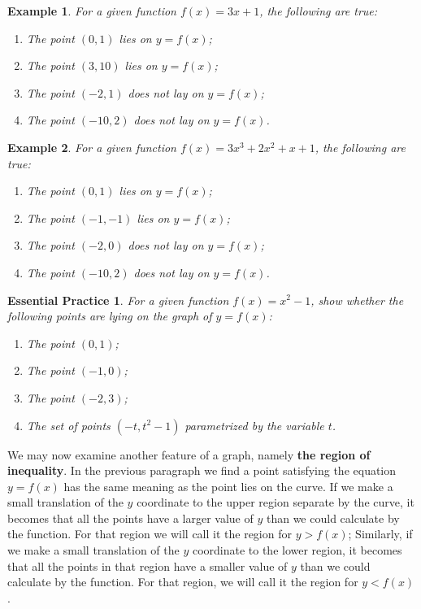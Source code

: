\documentclass[12pt]{article}
\newtheorem*{example}{Example}
\newtheorem{exercise}{Essential Practice}[subsection]
\begin{document}
    \begin{example}
        For a given function $f(x)=3x+1$, the following are true:\begin{enumerate}
            \item The point $(0,1)$ lies on $y=f(x)$;
            \item The point $(3,10)$ lies on $y=f(x)$;
            \item The point $(-2,1)$ does not lay on $y=f(x)$;
            \item The point $(-10,2)$ does not lay on $y=f(x)$.
        \end{enumerate} 
    \end{example}

    \begin{example}
        For a given function $f(x)=3x^3+2x^2+x+1$, the following are true:\begin{enumerate}
            \item The point $(0,1)$ lies on $y=f(x)$;
            \item The point $(-1,-1)$ lies on $y=f(x)$;
            \item The point $(-2,0)$ does not lay on $y=f(x)$;
            \item The point $(-10,2)$ does not lay on $y=f(x)$.
        \end{enumerate} 
    \end{example}

    \begin{exercise}
        For a given function $f(x)=x^2-1$, show whether the following points are lying on the graph of $y=f(x)$:\begin{enumerate}
            \item The point $(0,1)$;
            \item The point $(-1,0)$;
            \item The point $(-2,3)$;
            \item The set of points $(-t,t^2-1)$ parametrized by the variable $t$.
        \end{enumerate} 
    \end{exercise}

    We may now examine another feature of a graph, namely \textbf{the region of inequality}. In the previous paragraph we find a point satisfying the equation $y=f(x)$ has the same meaning as the point lies on the curve. If we make a small translation of the $y$ coordinate to the upper region separate by the curve, it becomes that all the points have a larger value of $y$ than we could calculate by the function. For that region we will call it the region for $y>f(x)$; Similarly, if we make a small translation of the $y$ coordinate to the lower region, it becomes that all the points in that region have a smaller value of $y$ than we could calculate by the function. For that region, we will call it the region for $y<f(x)$.
\end{document}
